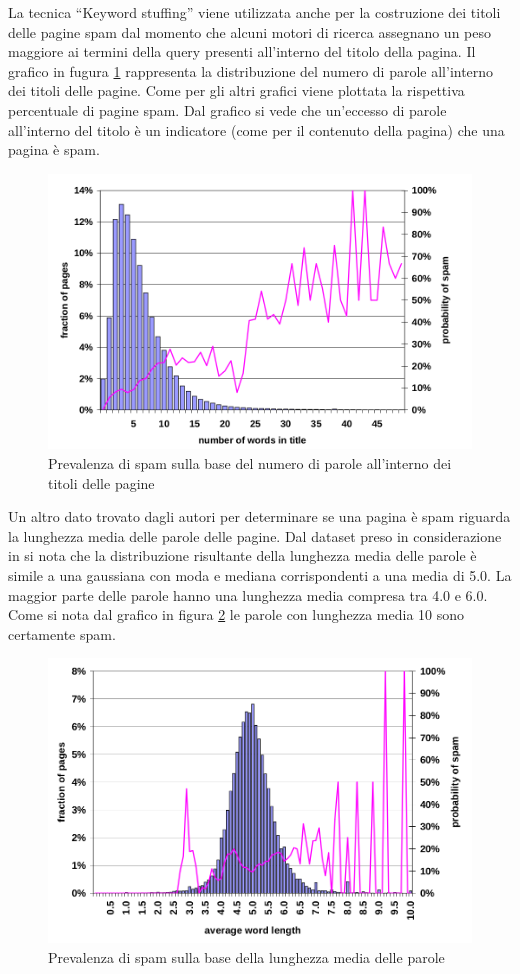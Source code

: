 La tecnica ``Keyword stuffing'' viene utilizzata anche per la costruzione dei titoli delle pagine spam dal momento che alcuni motori di ricerca assegnano un peso maggiore ai termini della query presenti all'interno del titolo della pagina. Il grafico in fugura \ref{fig:fetterly4} rappresenta la distribuzione del numero di parole all'interno dei titoli delle pagine. Come per gli altri grafici viene plottata la rispettiva percentuale di pagine spam. Dal grafico si vede che un'eccesso di parole all'interno del titolo è un indicatore (come per il contenuto della pagina) che una pagina è spam.
\begin{figure}[htbp]
\centering
\includegraphics[width=12cm]{immagini/fetterly/fetterly4}
\caption{Prevalenza di spam sulla base del numero di parole all'interno dei titoli delle pagine}
\label{fig:fetterly4}
\end{figure}

Un altro dato trovato dagli autori per determinare se una pagina è spam riguarda la lunghezza media delle parole delle pagine. Dal dataset preso in considerazione in \cite{Ntoulas:2006:DSW:1135777.1135794} si nota che la distribuzione risultante della lunghezza media delle parole è simile a una gaussiana con moda e mediana corrispondenti a una media di 5.0. La maggior parte delle parole hanno una lunghezza media compresa tra 4.0 e 6.0. Come si nota dal grafico in figura \ref{fig:fetterly5} le parole con lunghezza media 10 sono certamente spam.
\begin{figure}[htbp]
\centering
\includegraphics[width=12cm]{immagini/fetterly/fetterly5}
\caption{Prevalenza di spam sulla base della lunghezza media delle parole}
\label{fig:fetterly5}
\end{figure}